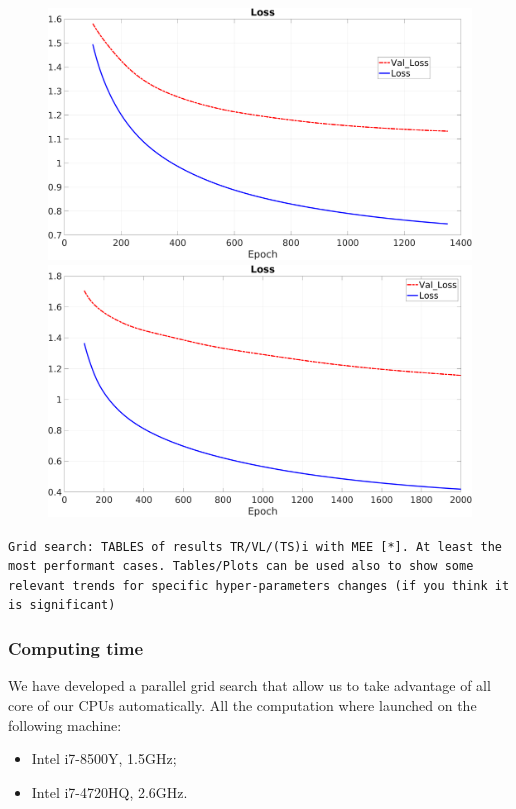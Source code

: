 \vspace{0.5cm}
\begin{figure}[H]
	\centering
	\begin{minipage}[t]{0.5\linewidth}
		\includegraphics[width=\linewidth]{img/Cup_loss_Reg_Zoom_2l.png}
	\end{minipage}%
	\begin{minipage}[t]{0.5\linewidth}
		\includegraphics[width=\linewidth]{img/Cup_loss_Reg_Zoom_5l.png}
	\end{minipage}
\end{figure}

\texttt{Grid search: TABLES of results TR/VL/(TS)i with  MEE [*]. At least the most performant cases. Tables/Plots can be used also to show some relevant trends for specific hyper-parameters changes (if you think it is significant) }
\subsubsection{Computing time}
We have developed a parallel grid search that allow us to take advantage of all core of our CPUs automatically. All the computation where launched on the following machine:
\begin{itemize}
	\item Intel i7-8500Y, 1.5GHz;
	\item Intel i7-4720HQ, 2.6GHz.
	
\end{itemize}

